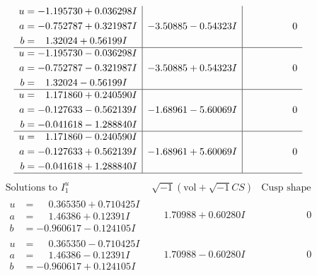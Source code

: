 \documentclass[1p]{elsarticle_modified}
\theoremstyle{definition}
\newcommand{\I}{\sqrt{-1}}
\begin{document}
$$\begin{array}{c|c|c}
\begin{aligned}
u &= -1.195730 + 0.036298 I \\
a &= -0.752787 + 0.321987 I \\
b &= \phantom{-}1.32024 + 0.56199 I\end{aligned}
 & -3.50885 - 0.54323 I & \phantom{-0.000000 } 0 \\ \hline\begin{aligned}
u &= -1.195730 - 0.036298 I \\
a &= -0.752787 - 0.321987 I \\
b &= \phantom{-}1.32024 - 0.56199 I\end{aligned}
 & -3.50885 + 0.54323 I & \phantom{-0.000000 } 0 \\ \hline\begin{aligned}
u &= \phantom{-}1.171860 + 0.240590 I \\
a &= -0.127633 - 0.562139 I \\
b &= -0.041618 - 1.288840 I\end{aligned}
 & -1.68961 - 5.60069 I & \phantom{-0.000000 } 0 \\ \hline\begin{aligned}
u &= \phantom{-}1.171860 - 0.240590 I \\
a &= -0.127633 + 0.562139 I \\
b &= -0.041618 + 1.288840 I\end{aligned}
 & -1.68961 + 5.60069 I & \phantom{-0.000000 } 0\\
 \hline 
 \end{array}$$\newpage$$\begin{array}{c|c|c}  
\text{Solutions to }I^u_{1}& \I (\text{vol} + \sqrt{-1}CS) & \text{Cusp shape}\\
 \hline 
\begin{aligned}
u &= \phantom{-}0.365350 + 0.710425 I \\
a &= \phantom{-}1.46386 + 0.12391 I \\
b &= -0.960617 - 0.124105 I\end{aligned}
 & \phantom{-}1.70988 + 0.60280 I & \phantom{-0.000000 } 0 \\ \hline\begin{aligned}
u &= \phantom{-}0.365350 - 0.710425 I \\
a &= \phantom{-}1.46386 - 0.12391 I \\
b &= -0.960617 + 0.124105 I\end{aligned}
 & \phantom{-}1.70988 - 0.60280 I & \phantom{-0.000000 } 0 \\ \hline\begin{aligned}

\end{aligned}
\end{array}$$
\end{document}
